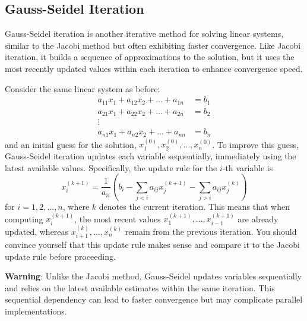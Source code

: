 \subsection{Gauss-Seidel Iteration}
Gauss-Seidel iteration is another iterative method for solving linear systems, similar to the Jacobi method but often exhibiting faster convergence. Like Jacobi iteration, it builds a sequence of approximations to the solution, but it uses the most recently updated values within each iteration to enhance convergence speed.

Consider the same linear system as before:
\begin{align*}
    a_{11}x_1 + a_{12}x_2 + \dots + a_{1n} & = b_1 \\
    a_{21}x_1 + a_{22}x_2 + \dots + a_{2n} & = b_2 \\
    \vdots & \\
    a_{n1}x_1 + a_{n2}x_2 + \dots + a_{nn} & = b_n
\end{align*}
and an initial guess for the solution, $ x_1^{(0)}, x_2^{(0)}, \dots, x_n^{(0)} $. To improve this guess, Gauss-Seidel iteration updates each variable sequentially, immediately using the latest available values. Specifically, the update rule for the $i$-th variable is
\begin{equation*}
    x_i^{(k+1)} = \frac{1}{a_{ii}} \left( b_i - \sum_{j < i} a_{ij}x_j^{(k+1)} - \sum_{j > i} a_{ij}x_j^{(k)} \right)
\end{equation*}
for $ i = 1, 2, \dots, n $, where $ k $ denotes the current iteration. This means that when computing $ x_i^{(k+1)} $, the most recent values $ x_1^{(k+1)}, \dots, x_{i-1}^{(k+1)} $ are already updated, whereas $ x_{i+1}^{(k)}, \dots, x_n^{(k)} $ remain from the previous iteration. You should convince yourself that this update rule makes sense and compare it to the Jacobi update rule before proceeding.

\begin{warningBox}
    \textbf{Warning}: Unlike the Jacobi method, Gauss-Seidel updates variables sequentially and relies on the latest available estimates within the same iteration. This sequential dependency can lead to faster convergence but may complicate parallel implementations.
\end{warningBox}

